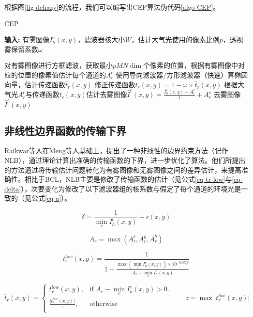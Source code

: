  根据图\ref{fig-dehazy}的流程，我们可以编写出CEP算法伪代码\ref{algo-CEP}。

 \begin{algorithm}[t]
     \caption{CEP}
     \label{algo-CEP}
     \textbf{输入:} 有雾图像$I_h^c(x,y)$，滤波器核大小$W$，估计大气光使用的像素比例$p$，透视雾保留系数$\omega$
     \begin{algorithmic}
     \State 对有雾图像进行方框滤波，获取最小$pMN\dim$个像素的位置，根据有雾图像中对应的位置的像素值估计每个通道的$A_r^c$
     \State 使用导向滤波器/方形滤波器（快速）算椭圆向量，估计传递函数$\hat t_r(x,y)$
     \State 修正传递函数$t_r(x,y) = 1 - \omega\times \hat t_r(x,y)$
     \State 根据大气光$A_r^c$与传递函数$t_r(x,y)$估计去雾图像$\hat I^c(x,y) = \frac{I_h^c(x,y) - A_r^c}{t} + A_r^c$
     \State \Return 去雾图像$\hat I^c(x,y)$
     \end{algorithmic}
 \end{algorithm}
\subsection{非线性边界函数的传输下界}
Raikwar等人\cite{raikwar.tapaswi2020}在Meng等人\cite{meng.pan201312}基础上，提出了一种非线性的边界约束方法（记作NLB），通过理论计算出准确的传输函数的下界，进一步优化了算法。他们所提出的方法通过将传输估计问题转化为有雾图像和无雾图像之间的差异估计，来提高准确性。相比于BCL，NLB主要是修改了传输函数的估计（见公式\eqref{eq-tr-low}与\eqref{eq-delta}），次要变化为修改了以下滤波器组的核系数与假定了每个通道的环境光是一致的（见公式\eqref{eq-a}）。

\begin{equation}
    \delta = \frac{1}{\min\limits_{c}I_h^c(x,y)} + \epsilon(x,y)
    \label{eq-delta}
\end{equation}

\begin{equation}
    A_r = \max{(A_r^r,A_r^g,A_r^b)}
    \label{eq-a}
\end{equation}

\begin{equation}
    t_r^{low}(x,y) = \frac{1}{1 + \frac{\max{(\min\limits_{c}I_h^c(x,y))}\times 10^{-0.05\zeta\delta}}{A_r - \min\limits_{c}I_h^c(x,y)}}
    \label{eq-tr-low}
\end{equation}

\begin{equation}
    \hat t_r(x,y) = \left\{\begin{matrix}t_r^{low}(x,y), & \text{if } A_r - \min\limits_{c}I_h^c(x,y) > 0.\\
        \frac{\lvert t_r^{low}(x,y) \rvert}{z}, & \text{otherwise}\\\end{matrix}\right. \qquad z = \max \lvert t_r^{low}(x,y) \rvert
    \label{eq-tr-nlb}
\end{equation}


